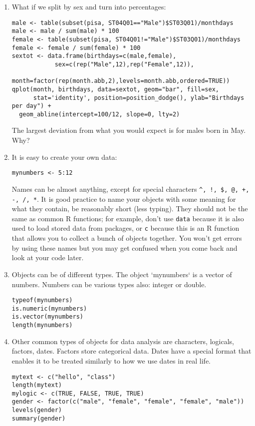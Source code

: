 \documentclass[11pt]{article}
\begin{document}
\begin{enumerate}
\item What if we split by sex and turn into percentages:
\begin{verbatim}
male <- table(subset(pisa, ST04Q01=="Male")$ST03Q01)/monthdays
male <- male / sum(male) * 100
female <- table(subset(pisa, ST04Q01!="Male")$ST03Q01)/monthdays
female <- female / sum(female) * 100
sextot <- data.frame(birthdays=c(male,female),
            sex=c(rep("Male",12),rep("Female",12)),
            month=factor(rep(month.abb,2),levels=month.abb,ordered=TRUE))
qplot(month, birthdays, data=sextot, geom="bar", fill=sex, 
      stat='identity', position=position_dodge(), ylab="Birthdays per day") +
  geom_abline(intercept=100/12, slope=0, lty=2)
\end{verbatim}
The largest deviation from what you would expect is for males born in May. Why?

\item It is easy to create your own data:

\begin{verbatim}
mynumbers <- 5:12
\end{verbatim}

Names can be almost anything, except for special characters \verb|^, !, $, @, +, -, /, *|. It is good practice to name your objects with some meaning for what they contain, be reasonably short (less typing). They should not be the same as common R functions; for example, don't use \verb|data| because it is also used to load stored data from packages, or \verb|c| because this is an R function that allows you to collect a bunch of objects together. You won't get errors by using these names but you may get confused when you come back and look at your code later. 


\item Objects can be of different types. The object `mynumbers` is a vector of numbers. Numbers can be various types also: integer or double.
\begin{verbatim}
typeof(mynumbers)
is.numeric(mynumbers)
is.vector(mynumbers)
length(mynumbers)
\end{verbatim}

\item 
Other common types of objects for data analysis are characters, logicals, factors, dates. Factors store categorical data. Dates have a special format that enables it to be treated similarly to how we use dates in real life.
\begin{verbatim}
mytext <- c("hello", "class")
length(mytext)
mylogic <- c(TRUE, FALSE, TRUE, TRUE)
gender <- factor(c("male", "female", "female", "female", "male"))
levels(gender)
summary(gender)
\end{verbatim}


\end{enumerate}
\end{document}
